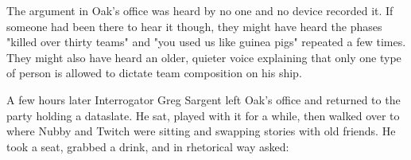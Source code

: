 The argument in Oak's office was heard by no one and no device recorded it. 
If someone had been there to hear it though, they might have heard the phases "killed over thirty teams" and "you used us like guinea pigs" repeated a few times. 
They might also have heard an older, quieter voice explaining that only one type of person is allowed to dictate team composition on his ship.

A few hours later Interrogator Greg Sargent left Oak's office and returned to the party holding a dataslate. 
He sat, played with it for a while, then walked over to where Nubby and Twitch were sitting and swapping stories with old friends. 
He took a seat, grabbed a drink, and in rhetorical way asked:


